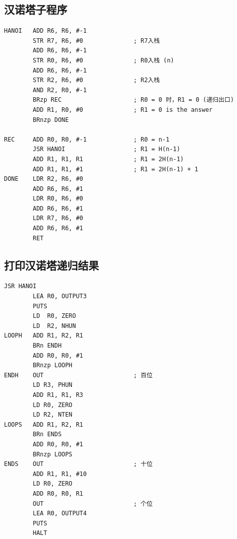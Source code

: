 \documentclass[UTF8]{ctexart}
\begin{document}
\subsection{汉诺塔子程序}
\begin{lstlisting}[basicstyle=\ttfamily,language={[x86masm]Assembler}]
HANOI   ADD R6, R6, #-1
        STR R7, R6, #0              ; R7入栈
        ADD R6, R6, #-1
        STR R0, R6, #0              ; R0入栈 (n)
        ADD R6, R6, #-1
        STR R2, R6, #0              ; R2入栈
        AND R2, R0, #-1
        BRzp REC                    ; R0 = 0 时，R1 = 0 (递归出口)    
        ADD R1, R0, #0              ; R1 = 0 is the answer
        BRnzp DONE

REC     ADD R0, R0, #-1             ; R0 = n-1
        JSR HANOI                   ; R1 = H(n-1)
        ADD R1, R1, R1              ; R1 = 2H(n-1)
        ADD R1, R1, #1              ; R1 = 2H(n-1) + 1
DONE    LDR R2, R6, #0
        ADD R6, R6, #1
        LDR R0, R6, #0
        ADD R6, R6, #1
        LDR R7, R6, #0
        ADD R6, R6, #1
        RET
\end{lstlisting}

\subsection{打印汉诺塔递归结果}
\begin{lstlisting}[basicstyle=\ttfamily,language={[x86masm]Assembler}]
        JSR HANOI
        LEA R0, OUTPUT3
        PUTS
        LD  R0, ZERO
        LD  R2, NHUN
LOOPH   ADD R1, R2, R1
        BRn ENDH
        ADD R0, R0, #1
        BRnzp LOOPH
ENDH    OUT                         ; 百位
        LD R3, PHUN
        ADD R1, R1, R3
        LD R0, ZERO
        LD R2, NTEN
LOOPS   ADD R1, R2, R1
        BRn ENDS
        ADD R0, R0, #1
        BRnzp LOOPS
ENDS    OUT                         ; 十位
        ADD R1, R1, #10
        LD R0, ZERO
        ADD R0, R0, R1
        OUT                         ; 个位
        LEA R0, OUTPUT4
        PUTS
        HALT
\end{lstlisting}


\clearpage
\end{document}
